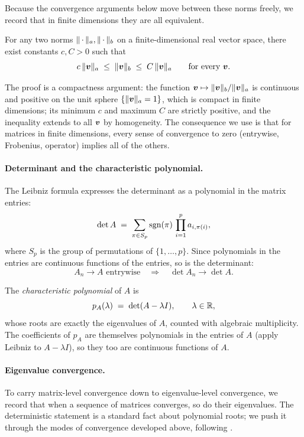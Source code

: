 Because the convergence arguments below move between these norms freely, we record that in finite dimensions they are all equivalent.

\begin{theorem}\label{thm:norm-equiv}
For any two norms \(\lVert\,\cdot\,\rVert_a, \lVert\,\cdot\,\rVert_b\) on a finite-dimensional real vector space, there exist constants \(c, C > 0\) such that
\[
  c\, \lVert\bm{v}\rVert_a \;\le\; \lVert\bm{v}\rVert_b \;\le\; C\, \lVert\bm{v}\rVert_a \qquad \text{for every } \bm{v}.
\]
\end{theorem}

The proof is a compactness argument: the function \(\bm{v} \mapsto \lVert\bm{v}\rVert_b / \lVert\bm{v}\rVert_a\) is continuous and positive on the unit sphere \(\{\lVert\bm{v}\rVert_a = 1\}\), which is compact in finite dimensions; its minimum \(c\) and maximum \(C\) are strictly positive, and the inequality extends to all \(\bm{v}\) by homogeneity. The consequence we use is that for matrices in finite dimensions, every sense of convergence to zero (entrywise, Frobenius, operator) implies all of the others.

\paragraph{Determinant and the characteristic polynomial.}
The Leibniz formula expresses the determinant as a polynomial in the matrix entries:
\begin{equation}
  \det A \;=\; \sum_{\pi \in S_p} \operatorname{sgn}(\pi)\, \prod_{i=1}^p a_{i, \pi(i)},
  \label{eq:leibniz}
\end{equation}
where \(S_p\) is the group of permutations of \(\{1, \ldots, p\}\). Since polynomials in the entries are continuous functions of the entries, so is the determinant:
\[
  A_n \to A \text{ entrywise} \quad \Longrightarrow \quad \det A_n \to \det A.
\]

The \emph{characteristic polynomial} of \(A\) is
\[
  p_A(\lambda) \;=\; \det(A - \lambda I), \qquad \lambda \in \mathbb{R},
\]
whose roots are exactly the eigenvalues of \(A\), counted with algebraic multiplicity. The coefficients of \(p_A\) are themselves polynomials in the entries of \(A\) (apply Leibniz to \(A - \lambda I\)), so they too are continuous functions of \(A\).

\paragraph{Eigenvalue convergence.}
To carry matrix-level convergence down to eigenvalue-level convergence, we record that when a sequence of matrices converges, so do their eigenvalues. The deterministic statement is a standard fact about polynomial roots; we push it through the modes of convergence developed above, following \citet[][Prop.~3.1]{Genzer2025}.

